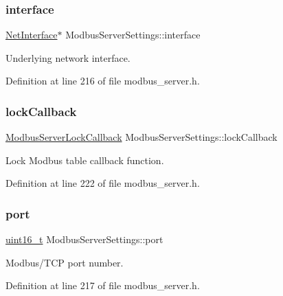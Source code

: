 \subsubsection{\texorpdfstring{interface}{interface}}
{\footnotesize\ttfamily \hyperlink{net_8h_a2234db8911a1148c9159979d8f5e0d6b}{Net\+Interface}$\ast$ Modbus\+Server\+Settings\+::interface}



Underlying network interface. 



Definition at line 216 of file modbus\+\_\+server.\+h.

\mbox{\label{structModbusServerSettings_ab5fc3a85c04473ffc6f99fd769c4030e}} 
\subsubsection{\texorpdfstring{lock\+Callback}{lockCallback}}
{\footnotesize\ttfamily \hyperlink{modbus__server_8h_a81193c898fb5f09885891ee3d7bcda85}{Modbus\+Server\+Lock\+Callback} Modbus\+Server\+Settings\+::lock\+Callback}



Lock Modbus table callback function. 



Definition at line 222 of file modbus\+\_\+server.\+h.

\mbox{\label{structModbusServerSettings_a0da7876580b2d9302e1d3a3b85ec9060}} 
\subsubsection{\texorpdfstring{port}{port}}
{\footnotesize\ttfamily \hyperlink{stdint_8h_a273cf69d639a59973b6019625df33e30}{uint16\+\_\+t} Modbus\+Server\+Settings\+::port}



Modbus/\+T\+CP port number. 



Definition at line 217 of file modbus\+\_\+server.\+h.

\mbox{\label{structModbusServerSettings_afec0a1863beec0c5d46bf137cf00d570}} 
